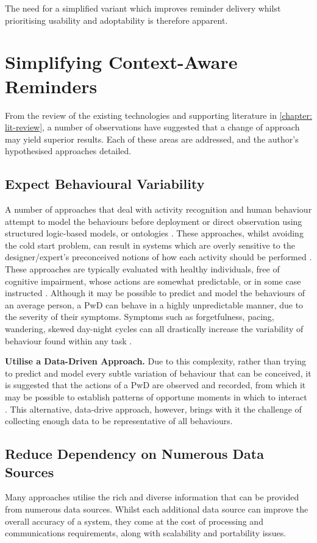 The need for a simplified variant which improves reminder delivery whilst prioritising usability and adoptability is therefore apparent.

\section{Simplifying Context-Aware Reminders} \label{section: simplifyingcontextaware}
From the review of the existing technologies and supporting literature in \ref{chapter: lit-review}, a number of observations have suggested that a change of approach may yield superior results. Each of these areas are addressed, and the author's hypothesised approaches detailed.

\subsection{Expect Behavioural Variability}
A number of approaches that deal with activity recognition and human behaviour attempt to model the behaviours before deployment or direct observation using structured logic-based models, or ontologies \cite{Chen2012b}. These approaches, whilst avoiding the cold start problem, can result in systems which are overly sensitive to the designer/expert's preconceived notions of how each activity should be performed \cite{Tang2011, Hoey2010}. These approaches are typically evaluated with healthy individuals, free of cognitive impairment, whose actions are somewhat predictable, or in some case instructed \cite{Chen2012b}. Although it may be possible to predict and model the behaviours of an average person, a PwD can behave in a highly unpredictable manner, due to the severity of their symptoms. Symptoms such as forgetfulness, pacing, wandering, skewed day-night cycles can all drastically increase the variability of behaviour found within any task \cite{Galway2013}.

\textbf{Utilise a Data-Driven Approach.} Due to this complexity, rather than trying to predict and model every subtle variation of behaviour that can be conceived, it is suggested that the actions of a PwD are observed and recorded, from which it may be possible to establish patterns of opportune moments in which to interact \cite{Morris2003}. This alternative, data-drive approach, however, brings with it the challenge of collecting enough data to be representative of all behaviours. 

\subsection{Reduce Dependency on Numerous Data Sources}
Many approaches utilise the rich and diverse information that can be provided from numerous data sources. Whilst each additional data source can improve the overall accuracy of a system, they come at the cost of processing and communications requirements, along with scalability and portability issues.

